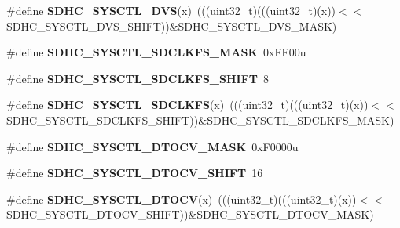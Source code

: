 \begin{DoxyCompactItemize}
\item 
\#define {\bfseries S\+D\+H\+C\+\_\+\+S\+Y\+S\+C\+T\+L\+\_\+\+D\+VS}(x)~(((uint32\+\_\+t)(((uint32\+\_\+t)(x))$<$$<$S\+D\+H\+C\+\_\+\+S\+Y\+S\+C\+T\+L\+\_\+\+D\+V\+S\+\_\+\+S\+H\+I\+FT))\&S\+D\+H\+C\+\_\+\+S\+Y\+S\+C\+T\+L\+\_\+\+D\+V\+S\+\_\+\+M\+A\+SK)\hypertarget{group__SDHC__Register__Masks_gaa00d0f672befe002bdc5ab4c68fdf2a5}{}\label{group__SDHC__Register__Masks_gaa00d0f672befe002bdc5ab4c68fdf2a5}

\item 
\#define {\bfseries S\+D\+H\+C\+\_\+\+S\+Y\+S\+C\+T\+L\+\_\+\+S\+D\+C\+L\+K\+F\+S\+\_\+\+M\+A\+SK}~0x\+F\+F00u\hypertarget{group__SDHC__Register__Masks_gabfdc7b569ff6f7eb889833e218ac251f}{}\label{group__SDHC__Register__Masks_gabfdc7b569ff6f7eb889833e218ac251f}

\item 
\#define {\bfseries S\+D\+H\+C\+\_\+\+S\+Y\+S\+C\+T\+L\+\_\+\+S\+D\+C\+L\+K\+F\+S\+\_\+\+S\+H\+I\+FT}~8\hypertarget{group__SDHC__Register__Masks_ga773898be0f7bf2952f8d99428f200f69}{}\label{group__SDHC__Register__Masks_ga773898be0f7bf2952f8d99428f200f69}

\item 
\#define {\bfseries S\+D\+H\+C\+\_\+\+S\+Y\+S\+C\+T\+L\+\_\+\+S\+D\+C\+L\+K\+FS}(x)~(((uint32\+\_\+t)(((uint32\+\_\+t)(x))$<$$<$S\+D\+H\+C\+\_\+\+S\+Y\+S\+C\+T\+L\+\_\+\+S\+D\+C\+L\+K\+F\+S\+\_\+\+S\+H\+I\+FT))\&S\+D\+H\+C\+\_\+\+S\+Y\+S\+C\+T\+L\+\_\+\+S\+D\+C\+L\+K\+F\+S\+\_\+\+M\+A\+SK)\hypertarget{group__SDHC__Register__Masks_ga6478bc3b20101ec058f6005092a8835b}{}\label{group__SDHC__Register__Masks_ga6478bc3b20101ec058f6005092a8835b}

\item 
\#define {\bfseries S\+D\+H\+C\+\_\+\+S\+Y\+S\+C\+T\+L\+\_\+\+D\+T\+O\+C\+V\+\_\+\+M\+A\+SK}~0x\+F0000u\hypertarget{group__SDHC__Register__Masks_gaa17354539833a6acfd128354f34d2e57}{}\label{group__SDHC__Register__Masks_gaa17354539833a6acfd128354f34d2e57}

\item 
\#define {\bfseries S\+D\+H\+C\+\_\+\+S\+Y\+S\+C\+T\+L\+\_\+\+D\+T\+O\+C\+V\+\_\+\+S\+H\+I\+FT}~16\hypertarget{group__SDHC__Register__Masks_ga333315b6c4564242ddc38a7ba077b5ae}{}\label{group__SDHC__Register__Masks_ga333315b6c4564242ddc38a7ba077b5ae}

\item 
\#define {\bfseries S\+D\+H\+C\+\_\+\+S\+Y\+S\+C\+T\+L\+\_\+\+D\+T\+O\+CV}(x)~(((uint32\+\_\+t)(((uint32\+\_\+t)(x))$<$$<$S\+D\+H\+C\+\_\+\+S\+Y\+S\+C\+T\+L\+\_\+\+D\+T\+O\+C\+V\+\_\+\+S\+H\+I\+FT))\&S\+D\+H\+C\+\_\+\+S\+Y\+S\+C\+T\+L\+\_\+\+D\+T\+O\+C\+V\+\_\+\+M\+A\+SK)\hypertarget{group__SDHC__Register__Masks_ga1e1110144cc16dd7711f8acbd1bfd8b3}{}\label{group__SDHC__Register__Masks_ga1e1110144cc16dd7711f8acbd1bfd8b3}


\end{DoxyCompactItemize}
